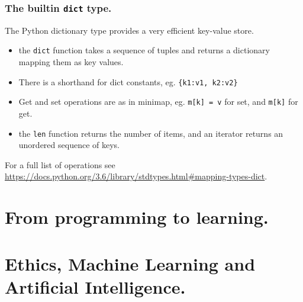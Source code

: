 \documentclass{beamer} %
\begin{document}

\begin{frame}
\frametitle{The builtin \texttt{dict} type.}

The Python dictionary type provides a very efficient key-value store.
\begin{itemize}
  \item the \texttt{dict} function takes a sequence of tuples and returns a dictionary mapping them as key values.
  \item There is a shorthand for dict constants, eg. \texttt{\{k1:v1, k2:v2\}}
  \item Get and set operations are as in minimap, eg. \texttt{m[k] = v} for set, and \texttt{m[k]} for get.
  \item the \texttt{len} function returns the number of items, and an iterator returns an unordered sequence of keys.
\end{itemize}

\vspace{3mm} 
For a full list of operations see \url{https://docs.python.org/3.6/library/stdtypes.html\#mapping-types-dict}.

\end{frame}

\section{From programming to learning.}

\section{Ethics, Machine Learning and Artificial Intelligence.}
\end{document}

